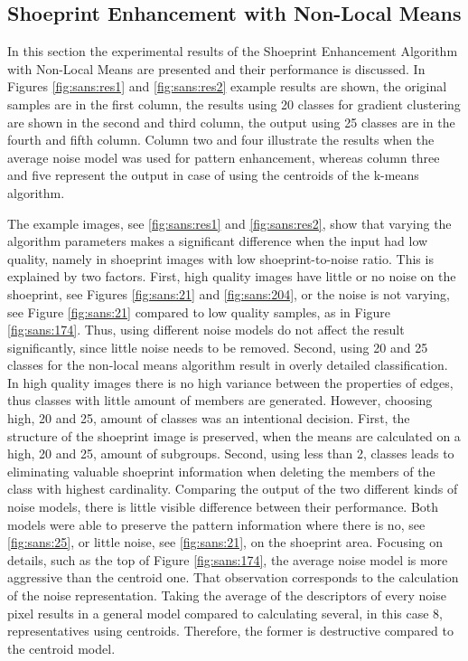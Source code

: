 \documentclass[draft,final]{vutinfth} %
\begin{document}
\subsection{Shoeprint Enhancement with Non-Local Means}
\par
In this section the experimental results of the Shoeprint Enhancement Algorithm with Non-Local Means are presented and their performance is discussed.
In Figures \ref{fig:sans:res1} and \ref{fig:sans:res2} example results are shown, the original samples are in the first column, the results using 20 classes for gradient clustering are shown in the second and third column, the output using 25 classes are in the fourth and fifth column.
Column two and four illustrate the results when the average noise model was used for pattern enhancement, whereas column three and five represent the output in case of using the centroids of the k-means algorithm.
\par
The example images, see  \ref{fig:sans:res1} and \ref{fig:sans:res2}, show that varying the algorithm parameters makes a significant difference when the input had low quality, namely in shoeprint images with low shoeprint-to-noise ratio.
This is explained by two factors.
First, high quality images have little or no noise on the shoeprint, see Figures \ref{fig:sans:21} and \ref{fig:sans:204}, or the noise is not varying, see Figure \ref{fig:sans:21} compared to low quality samples, as in Figure \ref{fig:sans:174}.
Thus, using different noise models do not affect the result significantly, since little noise needs to be removed.
Second, using 20 and 25 classes for the non-local means algorithm result in overly detailed classification.
In high quality images there is no high variance between the properties of edges, thus classes with little amount of members are generated.
However, choosing high, 20 and 25, amount of classes was an intentional decision. 
First, the structure of the shoeprint image is preserved, when the means are calculated on a high, 20 and 25, amount of subgroups.
Second, using less than 2, classes leads to eliminating valuable shoeprint information when deleting the members of the class with highest cardinality.
Comparing the output of the two different kinds of noise models, there is little visible difference between their performance.
Both models were able to preserve the pattern information where there is no, see  \ref{fig:sans:25}, or little noise, see  \ref{fig:sans:21}, on the shoeprint area.
Focusing on details, such as the top of Figure \ref{fig:sans:174}, the average noise model is more aggressive than the centroid one. 
That observation corresponds to the calculation of the noise representation.
Taking the average of the descriptors of every noise pixel results in a general model compared to calculating several, in this case 8, representatives using centroids.
Therefore, the former is destructive compared to the centroid model. 
\end{document}
